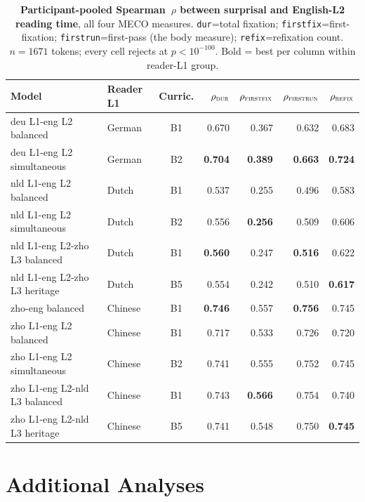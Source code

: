 \begin{table}[!ht]
  \centering \small
  \setlength{\tabcolsep}{4.5pt}
  \caption{\textbf{Participant-pooled Spearman~$\rho$ between \beetle{} surprisal and English-L2 reading time}, all four MECO measures. \texttt{dur}=total fixation; \texttt{firstfix}=first-fixation; \texttt{firstrun}=first-pass (the body measure); \texttt{refix}=refixation count. $n=1671$ tokens; every cell rejects at $p<10^{-100}$. Bold = best per column within reader-L1 group.}
  \label{tab:meco_english_l2_participants}
  \begin{tabular}{llcrrrr}
    \toprule
    Model & Reader L1 & Curric. & $\rho_\textsc{dur}$ & $\rho_\textsc{firstfix}$ & $\rho_\textsc{firstrun}$ & $\rho_\textsc{refix}$ \\
    \midrule
    deu L1-eng L2 balanced        & German  & B1 & 0.670 & 0.367 & 0.632 & 0.683 \\
    deu L1-eng L2 simultaneous    & German  & B2 & \textbf{0.704} & \textbf{0.389} & \textbf{0.663} & \textbf{0.724} \\
    \midrule
    nld L1-eng L2 balanced        & Dutch   & B1 & 0.537 & 0.255 & 0.496 & 0.583 \\
    nld L1-eng L2 simultaneous    & Dutch   & B2 & 0.556 & \textbf{0.256} & 0.509 & 0.606 \\
    nld L1-eng L2-zho L3 balanced & Dutch   & B1 & \textbf{0.560} & 0.247 & \textbf{0.516} & 0.622 \\
    nld L1-eng L2-zho L3 heritage & Dutch   & B5 & 0.554 & 0.242 & 0.510 & \textbf{0.617} \\
    \midrule
    zho-eng balanced              & Chinese & B1 & \textbf{0.746} & 0.557 & \textbf{0.756} & 0.745 \\
    zho L1-eng L2 balanced        & Chinese & B1 & 0.717 & 0.533 & 0.726 & 0.720 \\
    zho L1-eng L2 simultaneous    & Chinese & B2 & 0.741 & 0.555 & 0.752 & 0.745 \\
    zho L1-eng L2-nld L3 balanced & Chinese & B1 & 0.743 & \textbf{0.566} & 0.754 & 0.740 \\
    zho L1-eng L2-nld L3 heritage & Chinese & B5 & 0.741 & 0.548 & 0.750 & \textbf{0.745} \\
    \bottomrule
  \end{tabular}
\end{table}


\section{Additional Analyses}


